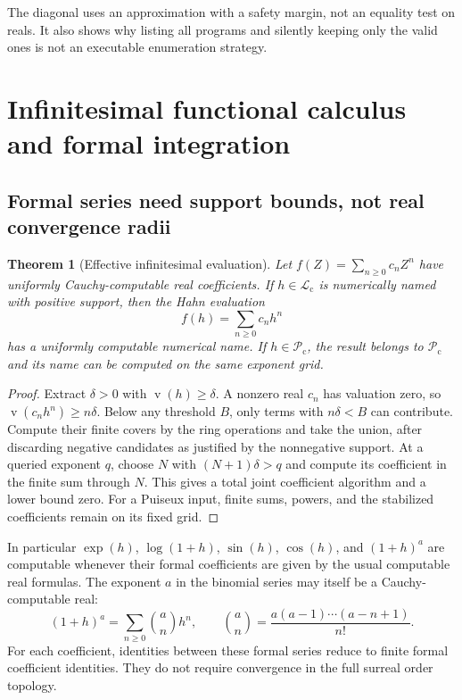 \documentclass[11pt,letterpaper]{article}
\numberwithin{equation}{section}
\newtheorem{theorem}{Theorem}[section]
\theoremstyle{definition}
\theoremstyle{remark}
\newcommand{\Lc}{\mathcal L_{\mathrm c}}
\newcommand{\Pc}{\mathcal P_{\mathrm c}}
\newcommand{\val}{\operatorname{v}}
\begin{document}
The diagonal uses an approximation with a safety margin, not an equality
test on reals. It also shows why listing all programs and silently keeping
only the valid ones is not an executable enumeration strategy.

\section{Infinitesimal functional calculus and formal integration}
\label{sec:functions}

\subsection{Formal series need support bounds, not real convergence radii}

\begin{theorem}[Effective infinitesimal evaluation]
\label{thm:evaluation}
Let $f(Z)=\sum_{n\ge0}c_nZ^n$ have uniformly Cauchy-computable real
coefficients. If $h\in\Lc$ is numerically named with positive support,
then the Hahn evaluation
\[
 f(h)=\sum_{n\ge0}c_nh^n
\]
has a uniformly computable numerical name. If $h\in\Pc$, the result
belongs to $\Pc$ and its name can be computed on the same exponent grid.
\end{theorem}
\begin{proof}
Extract $\delta>0$ with $\val(h)\ge\delta$. A nonzero real $c_n$ has
valuation zero, so $\val(c_nh^n)\ge n\delta$. Below any threshold $B$,
only terms with $n\delta<B$ can contribute. Compute their finite covers
by the ring operations and take the union, after discarding negative
candidates as justified by the nonnegative support. At a queried exponent
$q$, choose $N$ with $(N+1)\delta>q$ and compute its coefficient in the
finite sum through $N$. This gives a total joint coefficient algorithm and
a lower bound zero. For a Puiseux input, finite sums, powers, and the
stabilized coefficients remain on its fixed grid.
\end{proof}

In particular $\exp(h)$, $\log(1+h)$, $\sin(h)$, $\cos(h)$, and
$(1+h)^a$ are computable whenever their formal coefficients are given by
the usual computable real formulas. The exponent $a$ in the binomial
series may itself be a Cauchy-computable real:
\[
 (1+h)^a=\sum_{n\ge0}\binom an h^n,
 \qquad \binom an=\frac{a(a-1)\cdots(a-n+1)}{n!}.
\]
For each coefficient, identities between these formal series reduce to
finite formal coefficient identities. They do not require convergence in
the full surreal order topology.
\end{document}
